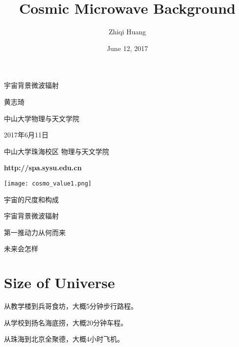 \documentclass[CJK]{beamer}
\title{Cosmic Microwave Background}
\author{Zhiqi Huang}
\institute{Sun Yat-sen University}
\date{June 12, 2017}
\begin{document}
\begin{frame}
  \bch
  \bcenter
      {\Huge 宇宙背景微波辐射}

      
      {\Large 黄志琦}

      \skipline
      
      中山大学物理与天文学院 
      
      {2017年6月11日}
      \ecenter
      \ech
\end{frame}


\begin{frame}
\bch
\centering

中山大学珠海校区 物理与天文学院


{\large \bf http://spa.sysu.edu.cn}

\ech
\end{frame}

\begin{frame}
\end{frame}


\begin{frame}
\end{frame}


\begin{frame}
\centering
\texttt{[image: cosmo\_value1.png]}
\end{frame}


\begin{frame}
\centering
\bch
\bitem
\item{宇宙的尺度和构成}
\item{宇宙背景微波辐射}
\item{第一推动力从何而来}
\item{未来会怎样}
  \eitem
  \ech
\end{frame}

\section{Size of Universe}
\begin{frame}
  \bch
  \bitem
\item{从教学楼到兵哥食坊，大概5分钟步行路程。}
\item{从学校到扬名海底捞，大概20分钟车程。}
\item{从珠海到北京全聚德，大概4小时飞机。}
  \eitem

  
  \ech
\end{frame}
\end{document}
